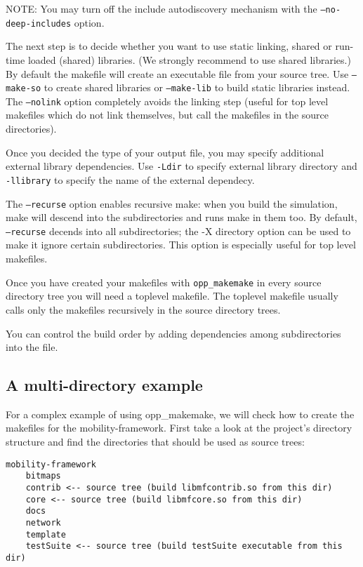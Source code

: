 NOTE: You may turn off the include autodiscovery mechanism with the \texttt{--no-deep-includes} option.

The next step is to decide whether you want to use static linking, 
shared or run-time loaded (shared) libraries. (We strongly
recommend to use shared libraries.) By default the makefile will create an executable
file from your source tree. Use \texttt{--make-so} to create shared libraries
or \texttt{--make-lib} to build static libraries instead. The \texttt{--nolink}
option completely avoids the linking step (useful for top level makefiles which do
not link themselves, but call the makefiles in the source directories).

Once you decided the type of your output file, you may specify additional external library
dependencies. Use \texttt{-Ldir} to specify external library directory and \texttt{-llibrary}
to specify the name of the external dependecy.

The \texttt{--recurse} option enables recursive make: when you build the simulation, make
will descend into the subdirectories and runs make in them too.
By default, \texttt{--recurse} decends into all subdirectories; the -X directory option
can be used to make it ignore certain subdirectories. This option is especially useful
for top level makefiles.

Once you have created your makefiles with \texttt{opp_makemake} in every source directory tree
you will need a toplevel makefile. The toplevel makefile usually calls only the makefiles 
recursively in the source directory trees.

You can control the build order by adding dependencies among subdirectories
into the  file.

\subsection{A multi-directory example}

For a complex example of using opp\_makemake, we will check how to create
the makefiles for the mobility-framework. First take a look at the
project's directory structure and find the directories that should be used as
source trees:

\begin{verbatim}
mobility-framework
    bitmaps
    contrib <-- source tree (build libmfcontrib.so from this dir)
    core <-- source tree (build libmfcore.so from this dir)
    docs
    network
    template
    testSuite <-- source tree (build testSuite executable from this dir)
\end{verbatim}

